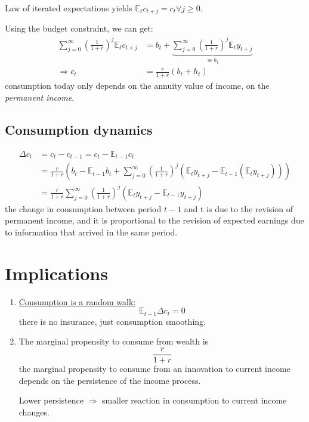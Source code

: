 Law of iterated expectations yields $\mathbb{E}_t c_{t+j} = c_t \forall j \geq 0.$

Using the budget constraint, we can get:
\begin{align*}
    \sum_{j=0}^{\infty }\left(\frac{1}{1+r}\right)^j \mathbb{E}_t c_{t+j} &= b_t + \underset{\equiv h_t}{\underbrace{\sum_{j=0}^{\infty }\left(\frac{1}{1+r}\right)^j \mathbb{E}_t y_{t+j} }} \\
    \Rightarrow c_t &= \frac{r}{1+r}(b_t + h_t)
\end{align*}
consumption today only depends on the annuity value of income,
on the \textit{permanent income}.

\subsection{Consumption dynamics}
\begin{align*}
    \Delta c_t &= c_t - c_{t-1} = c_t - \mathbb{E}_{t-1} c_t \\
    &= \frac{r}{1+r} \left( b_t - \mathbb{E}_{t-1} b_t + \sum_{j=0}^{\infty } \left(\frac{1}{1+r}\right)^j (\mathbb{E}_t y_{t+j} - \mathbb{E}_{t-1}(\mathbb{E}_t y_{t+j} ) ) \right) \\
    &= \frac{r}{1+r} \sum_{j=0}^{\infty } \left(\frac{1}{1+r}\right)^j (\mathbb{E}_t y_{t+j} - \mathbb{E}_{t-1} y_{t+j} )
\end{align*}
the change in consumption between period $t-1$ and t is due to
the revision of permanent income, and it is proportional to the
revision of expected earnings due to information that arrived in the
same period.


\section{Implications}
\begin{enumerate}
    \item \underline{Consumption is a random walk:}
    \[\mathbb{E}_{t-1} \Delta c_t = 0 \]
    there is no insurance, just consumption smoothing.

    \item The marginal propensity to consume from wealth is
    \[\frac{r}{1+r}\]
    the marginal propensity to consume from an innovation to 
    current income depends on the persistence of the income process.

    Lower persistence $\Rightarrow$ smaller reaction in consumption to
    current income changes.
\end{enumerate}